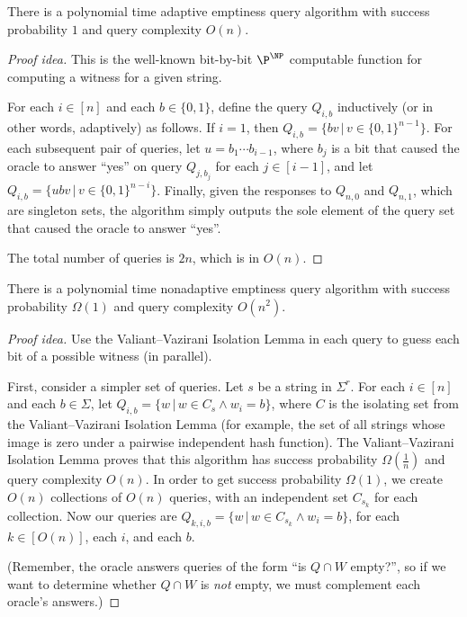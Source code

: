 \documentclass{article}
\begin{document}
\begin{theorem}\label{thm:naive}
  There is a polynomial time adaptive emptiness query algorithm with success probability $1$ and query complexity $O(n)$.
\end{theorem}
\begin{proof}[Proof idea]
  This is the well-known bit-by-bit $\P^\NP$ computable function for computing a witness for a given string.

  For each $i \in [n]$ and each $b \in \{0, 1\}$, define the query $Q_{i, b}$ inductively (or in other words, adaptively) as follows.
  If $i = 1$, then $Q_{i, b} = \{ b v \, | \, v \in {\{0, 1\}}^{n - 1}\}$.
  For each subsequent pair of queries, let $u = b_1 \dotsb b_{i - 1}$, where $b_j$ is a bit that caused the oracle to answer ``yes'' on query $Q_{j, b_j}$ for each $j \in [i - 1]$, and let $Q_{i, b} = \{ u b v \, | \, v \in {\{0, 1\}}^{n - i}\}$.
  Finally, given the responses to $Q_{n, 0}$ and $Q_{n, 1}$, which are singleton sets, the algorithm simply outputs the sole element of the query set that caused the oracle to answer ``yes''.

  The total number of queries is $2n$, which is in $O(n)$.
\end{proof}

\begin{theorem}
  There is a polynomial time nonadaptive emptiness query algorithm with success probability $\Omega(1)$ and query complexity $O(n^2)$.
\end{theorem}
\begin{proof}[Proof idea]
  Use the Valiant--Vazirani Isolation Lemma in each query to guess each bit of a possible witness (in parallel).

  First, consider a simpler set of queries.
  Let $s$ be a string in $\Sigma^r$.
  For each $i \in [n]$ and each $b \in \Sigma$, let $Q_{i, b} = \{ w \, | \, w \in C_s \land w_i = b\}$, where $C$ is the isolating set from the Valiant--Vazirani Isolation Lemma (for example, the set of all strings whose image is zero under a pairwise independent hash function).
  The Valiant--Vazirani Isolation Lemma proves that this algorithm has success probability $\Omega(\frac{1}{n})$ and query complexity $O(n)$.
  In order to get success probability $\Omega(1)$, we create $O(n)$ collections of $O(n)$ queries, with an independent set $C_{s_k}$ for each collection.
  Now our queries are $Q_{k, i, b} = \{ w \, | \, w \in C_{s_k} \land w_i = b\}$, for each $k \in \left[O(n)\right]$, each $i$, and each $b$.

  (Remember, the oracle answers queries of the form ``is $Q \cap W$ empty?'', so if we want to determine whether $Q \cap W$ is \emph{not} empty, we must complement each oracle's answers.)
\end{proof}
\end{document}
